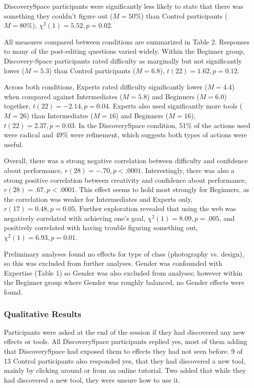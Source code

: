 Discovery\-Space participants were significantly less likely to state that there was something they couldn't figure out ($M = 50\%$) than Control participants ($M = 80\%$), $\chi^2(1) = 5.52, p = 0.02$. 

All measures compared between conditions are summarized in Table 2. Responses to many of the post-editing questions varied widely. Within the Beginner group, Discovery-Space participants rated difficulty as marginally but not significantly lower ($M = 5.3$) than Control participants ($M = 6.8$), $t(22) = 1.62, p = 0.12$. 

Across both conditions, Experts rated difficulty significantly lower ($M = 4.4$) when compared against Intermediates ($M = 5.8$) and Beginners ($M = 6.0$) together, $t(22) = -2.14, p = 0.04$. Experts also used significantly more tools ($M = 26$) than Intermediates ($M = 16$) and Beginners ($M = 16$), $t(22) = 2.37, p = 0.03$. In the Discovery\-Space condition, 51\% of the actions used were radical and 49\% were refinement, which suggests both types of actions were useful.

Overall, there was a strong negative correlation between difficulty and confidence about performance, $r(28) = -.70, p < .0001$. Interestingly, there was also a strong positive correlation between creativity and confidence about performance, $r(28) = .67, p < .0001$.  This effect seems to hold most strongly for Beginners, as the correlation was weaker for Intermediates and Experts only, $r(17) = 0.48, p = 0.05$. Further exploration revealed that using the web was negatively correlated with achieving one's goal, $\chi^2(1) = 8.09, p = .005$, and positively correlated with having trouble figuring something out, $\chi^2(1) = 6.93, p = 0.01$.

Preliminary analyses found no effects for type of class (photography vs. design), so this was excluded from further analyses. Gender was confounded with Expertise (Table 1) so Gender was also excluded from analyses; however within the Beginner group where Gender was roughly balanced, no Gender effects were found.

\subsubsection{Qualitative Results}
Participants were asked at the end of the session if they had discovered any new effects or tools. All Discovery\-Space participants replied yes, most of them adding that Discovery\-Space had exposed them to effects they had not seen before. 9 of 13 Control participants also responded yes, that they had discovered a new tool, mainly by clicking around or from an online tutorial. Two added that while they had discovered a new tool, they were unsure how to use it.

